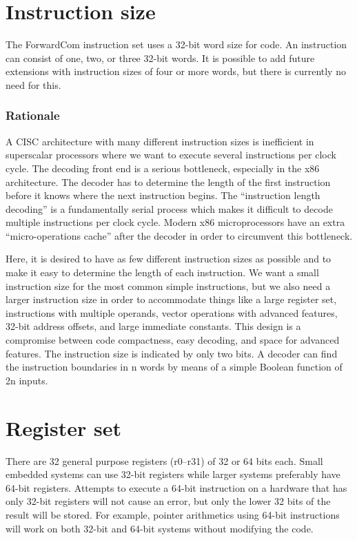 \documentclass[forwardcom.tex]{subfiles}
\begin{document}
\section{Instruction size}
The ForwardCom instruction set uses a 32-bit word size for code. 
An instruction can consist of one, two, or three 32-bit words. 
It is possible to add future extensions with instruction sizes of four or more words, but there is currently no need for this.

\subsubsection{Rationale}
A CISC architecture with many different instruction sizes is inefficient in superscalar processors where we want to execute several instructions per clock cycle. The decoding front end is a serious bottleneck, especially in the x86 architecture. The decoder has to determine the length of the first instruction before it knows where the next instruction begins. The ``instruction length decoding'' is a fundamentally serial process which makes it difficult to decode multiple instructions per clock cycle. Modern x86 microprocessors have an extra ``micro-operations cache'' after the decoder in order to circumvent this bottleneck.
\vv

Here, it is desired to have as few different instruction sizes as possible and to make it easy to determine the length of each instruction. We want a small instruction size for the most common simple instructions, but we also need a larger instruction size in order to accommodate things like a large register set, instructions with multiple operands, vector operations with advanced features, 32-bit address offsets, and large immediate constants. This design is a compromise between code compactness, easy decoding, and space for advanced features.
The instruction size is indicated by only two bits. A decoder can find the instruction boundaries in n words by means of a simple Boolean function of 2n inputs.

\section{Register set}
There are 32 general purpose registers (r0--r31) of 32 or 64 bits each. Small embedded systems can use 32-bit registers while larger systems preferably have 64-bit registers. Attempts to execute a 64-bit instruction on a hardware that has only 32-bit registers will not cause an error, but only the lower 32 bits of the result will be stored. For example, pointer arithmetics using 64-bit instructions will work on both 32-bit and 64-bit systems without modifying the code.
\vv
\end{document}
